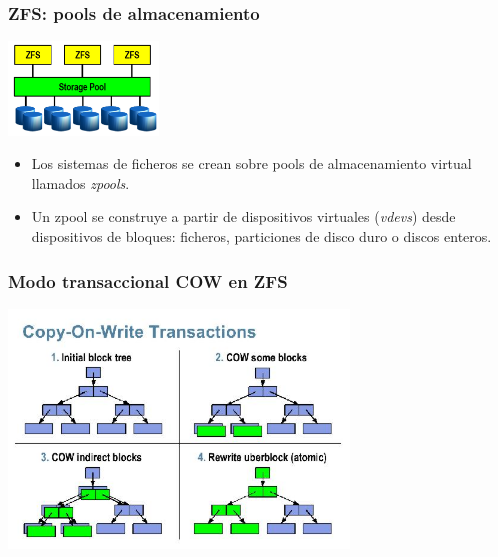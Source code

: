 \documentclass{beamer}
\begin{document}
\begin{frame}
  \frametitle{ZFS: pools de almacenamiento}

  \begin{center}
    \includegraphics[height=2.5cm]{figs/zfs_storage_pool.png}
  \end{center}
  \begin{itemize}
    \item Los sistemas de ficheros se crean sobre pools de almacenamiento virtual llamados {\it zpools}.
    \item Un zpool se construye a partir de dispositivos virtuales ({\it vdevs}) desde dispositivos de bloques: ficheros, particiones de disco duro o discos enteros.
  \end{itemize}
\end{frame}


\begin{frame}
  \frametitle{Modo transaccional COW en ZFS}

  \begin{center}
    \includegraphics[height=2.5in]{figs/cow.jpg}
  \end{center}
\end{frame}
\end{document}
